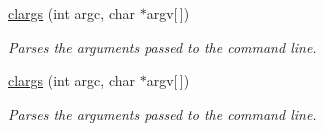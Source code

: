 \begin{DoxyCompactItemize}
\hyperlink{structclargs_ac5a54b5b965289a3ad0766317ae630dd}{clargs} (int argc, char $\ast$argv\mbox{[}$\,$\mbox{]})
\begin{DoxyCompactList}\small\item\em Parses the arguments passed to the command line. \item\end{DoxyCompactList}\item 
\hyperlink{structclargs_ac5a54b5b965289a3ad0766317ae630dd}{clargs} (int argc, char $\ast$argv\mbox{[}$\,$\mbox{]})
\begin{DoxyCompactList}\small\item\em Parses the arguments passed to the command line. \item\end{DoxyCompactList}\end{DoxyCompactItemize}
